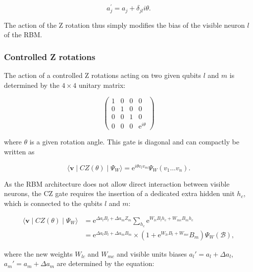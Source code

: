 \begin{equation}
    a^{\prime}_{j} = a_{j} + \delta_{jl}i\theta.
\end{equation}

The action of the Z rotation thus simply modifies the bias of the visible neuron $l$ of the RBM.

\subsubsection{Controlled Z rotations}
The action of a controlled Z rotations acting on two given qubits $l$ and $m$ is determined by
the $4\times4$ unitary matrix:

\begin{equation}
    \begin{pmatrix}
        1 & 0 & 0 & 0 \\
        0 & 1 & 0 & 0 \\
        0 & 0 & 1 & 0 \\
        0 & 0 & 0 & \mathrm{e}^{i\theta}
    \end{pmatrix}
\end{equation}

where $\theta$ is a given rotation angle. This gate is diagonal and can compactly be written as

\begin{equation}
    \langle \bm{v} \mid CZ(\theta) \mid \Psi_{W}  \rangle = 
    \mathrm{e}^{i\theta v_{l}v_{m}}\Psi_{W}(v_{1} \dots v_{n}).
\end{equation}

As the RBM architecture does not allow direct interaction between visible neurons, the CZ gate
requires the insertion of a dedicated extra hidden unit $h_{c}$, which is connected
to the qubits $l$ and $m$: 

\begin{align}
    \langle \bm{v} \mid CZ(\theta) \mid \Psi_{W}  \rangle &= 
    \mathrm{e}^{\Delta a_{l} B_{l} + \Delta a_{m} Z_{m}} \sum_{h_{c}}\mathrm{e}^{W_{lc} B_{l} h_{c} + W_{mc} B_{m} h_{c}} \\
    &= \mathrm{e}^{\Delta a_{l} B_{l} + \Delta a_{m} B_{m}} \times (1 + \mathrm{e}^{W_{lc} B_{l} + W_{mc}} B_{m}) \Psi_{W}(\mathcal{B}),
\end{align}

where the new weights $W_{lc}$ and $W_{mc}$ and visible units biases $a_{l}\prime= a_{l} + \Delta a_{l}$,
$a_{m}\prime= a_{m} + \Delta a_{m}$ are determined by the equation:


